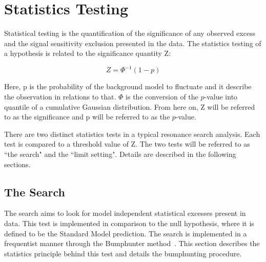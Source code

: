 \section{Statistics Testing}
\label{section:stats}
Statistical testing is the quantification of the significance of any observed excess and the signal sensitivity exclusion presented in the data. The statistics testing of a hypothesis is related to the significance quantity Z:

\begin{equation}
 Z= \Phi^{-1}(1-p) 
 \label{eq:significance}
\end{equation}

Here, p is the probability of the background model to fluctuate and it describe the observation in relations to that. $\Phi$ is the conversion of the $p$-value into quantile of a cumulative Gaussian distribution. From here on, Z will be referred to as the significance and p will be referred to as the $p$-value.

There are two distinct statistics tests in a typical resonance search analysis. Each test is compared to a threshold value of Z. The two tests will be referred to as ``the search" and the ``limit setting". Details are described in the following sections.





\subsection{The Search}
\label{sec:thesearch}

The search aims to look for model independent statistical excesses present in data. This test is implemented in comparison to the null hypothesis, where it is defined to be the Standard Model prediction. The search is implemented in a frequentist manner through the Bumphunter method~\cite{choudalakis2011hypothesis}. This section describes the statistics principle behind this test and details the bumphunting procedure. 

